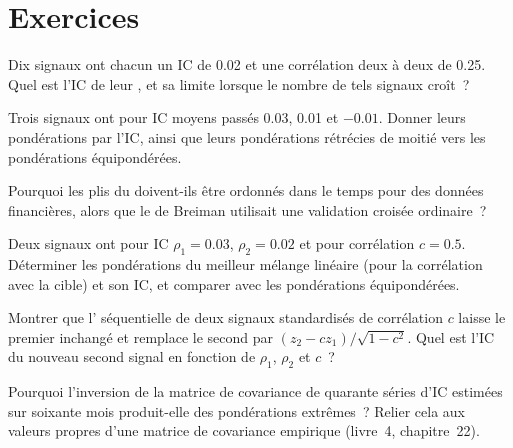 \section{Exercices}

\begin{exercise}[$\star$]\label{exo:rs:signal-combination:1}
Dix signaux ont chacun un IC de 0.02 et une corrélation deux à deux de 0.25. Quel est l'IC de leur , et sa limite lorsque le nombre de
tels signaux croît~?
\end{exercise}

\begin{exercise}[$\star$]\label{exo:rs:signal-combination:2}
Trois signaux ont pour IC moyens passés 0.03, 0.01 et $-0.01$. Donner leurs pondérations par l'IC, ainsi que leurs pondérations rétrécies de moitié vers les pondérations équipondérées.
\end{exercise}

\begin{exercise}[$\star$]\label{exo:rs:signal-combination:3}
Pourquoi les plis du  doivent-ils être ordonnés dans le temps pour des données financières, alors que le  de Breiman utilisait une validation croisée ordinaire~?
\end{exercise}

\begin{exercise}[$\star\star$]\label{exo:rs:signal-combination:4}
Deux signaux ont pour IC $\rho_1 = 0.03$, $\rho_2 = 0.02$ et pour corrélation $c = 0.5$. Déterminer les pondérations du meilleur mélange linéaire (pour la corrélation avec la
cible) et son IC, et comparer avec les pondérations équipondérées.
\end{exercise}

\begin{exercise}[$\star\star$]\label{exo:rs:signal-combination:5}
Montrer que l' séquentielle de deux signaux standardisés de corrélation $c$ laisse le premier inchangé et remplace le second par
$(z_2 - cz_1)/\sqrt{1 - c^2}$. Quel est l'IC du nouveau second signal en fonction de $\rho_1$, $\rho_2$ et $c$~?
\end{exercise}

\begin{exercise}[$\star\star$]\label{exo:rs:signal-combination:6}
Pourquoi l'inversion de la matrice de covariance de quarante séries d'IC estimées sur soixante mois produit-elle des pondérations extrêmes~? Relier cela aux valeurs propres
d'une matrice de covariance empirique (livre~4, chapitre~22).
\end{exercise}

